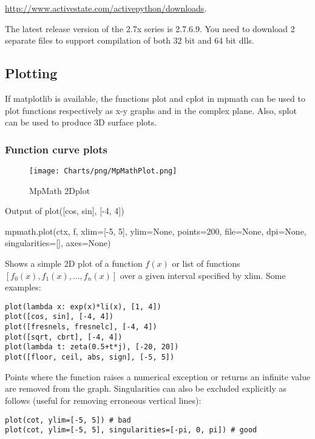 \vpara
\href{http://www.activestate.com/activepython/downloads}{http://www.activestate.com/activepython/downloads}.

\vpara
The latest release version of the 2.7x series is 2.7.6.9. You need to download 2 separate files to support compilation of both 32 bit and 64 bit dlls.






\newpage
\subsection{Plotting}

If matplotlib is available, the functions plot and cplot in mpmath can be used to plot functions respectively as x-y graphs and in the complex plane. Also, splot can be used to
produce 3D surface plots.

\subsubsection{Function curve plots}

\begin{figure}[ht]
	\centering
	\texttt{[image: Charts/png/MpMathPlot.png]}
	\caption{MpMath 2Dplot}
	\label{Fig MpMath 2Dplot}
\end{figure}


Output of plot([cos, sin], [-4, 4])

\vpara
mpmath.plot(ctx, f, xlim=[-5, 5], ylim=None, points=200, file=None, dpi=None, singularities=[], axes=None)

\vpara
Shows a simple 2D plot of a function $f(x)$ or list of functions $[f_0(x),f_1(x),\ldots,f_n(x)]$ over a given interval specified by xlim. Some examples:

\begin{lstlisting}
plot(lambda x: exp(x)*li(x), [1, 4])
plot([cos, sin], [-4, 4])
plot([fresnels, fresnelc], [-4, 4])
plot([sqrt, cbrt], [-4, 4])
plot(lambda t: zeta(0.5+t*j), [-20, 20])
plot([floor, ceil, abs, sign], [-5, 5])
\end{lstlisting}


Points where the function raises a numerical exception or returns an infinite value are removed from the graph. Singularities can also be excluded explicitly as follows (useful
for removing erroneous vertical lines):

\begin{lstlisting}
plot(cot, ylim=[-5, 5]) # bad
plot(cot, ylim=[-5, 5], singularities=[-pi, 0, pi]) # good
\end{lstlisting}


